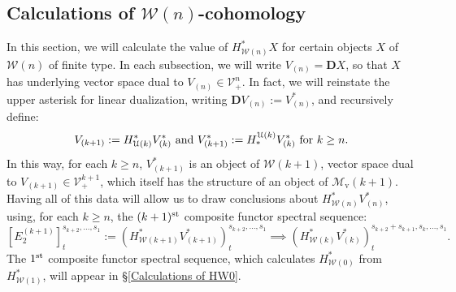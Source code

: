 \documentclass[11pt]{amsart} \renewcommand{\baselinestretch}{1.2}
\theoremstyle{plain}
\theoremstyle{definition}
\newcommand{\calU}{\mathcal{U}}
\newcommand{\calV}{\mathcal{V}}
\newcommand{\calw}{\mathcal{W}}
\newcommand{\calMv}{\mathcal{M}\dver}
\newcommand{\vect}[2]{\calV^{#1}_{#2}}
\newcommand{\E}[5]{[E^{#1}_{#2}#3]^{#4}_{#5}}
\newcommand{\dver}{_\mathrm{v}}
\newcommand{\dual}{\mathbf{D}}
\begin{document}
\begin{Calculations of HWn}
\section{\textbf{Calculations of ${\calw(n)}$-cohomology}}
\label{Calculations of HWn}
In this section, we will calculate the value of $H^*_{\calw(n)}X$ for certain  objects $X$ of $\calw(n)$ of finite type. In each subsection, we will write $V_{(n)}=\dual X$, so that $X$ has underlying vector space dual to $V_{{(n)}}\in\vect{n}{+}$. In fact, we will reinstate the upper asterisk for linear dualization, writing $\dual V_{(n)}:=V^*_{(n)}$, and recursively define:
\[V_{(k+1)}:=H^*_{\calU(k)}V^*_{(k)}\textup{ and }V^*_{(k+1)}:=H_*^{\calU(k)}V^*_{(k)}\textup{ for $k\geq n$}.\]
In this way, for each $k\geq n$, $V^*_{(k+1)}$ is an object of $\calw(k+1)$, vector space dual to $V_{(k+1)}\in\vect{k+1}{+}$, which itself has the structure of an object of $\calMv(k+1)$.
Having all of this data will allow us to draw conclusions about $H^*_{\calw(n)}V^*_{(n)}$, using, for each $k\geq n$, the $(k+1)^{\textup{st}}$ composite functor spectral sequence:
\[\E{(k+1)}{2}{}{s_{k+2},\ldots,s_1}{t}:=(H^*_{\calw(k+1)}V^*_{(k+1)})^{s_{k+2},\ldots,s_1}_{t}\implies (H^*_{\calw(k)}V^*_{(k)})^{s_{k+2}+s_{k+1},s_k,\ldots,s_1}_{t}.\]
The $1^{\textup{st}}$ composite functor spectral sequence, which calculates $H^*_{\calw(0)}$ from $H^*_{\calw(1)}$, will appear in \S\ref{Calculations of HW0}.




\end{Calculations of HWn}
\end{document}
